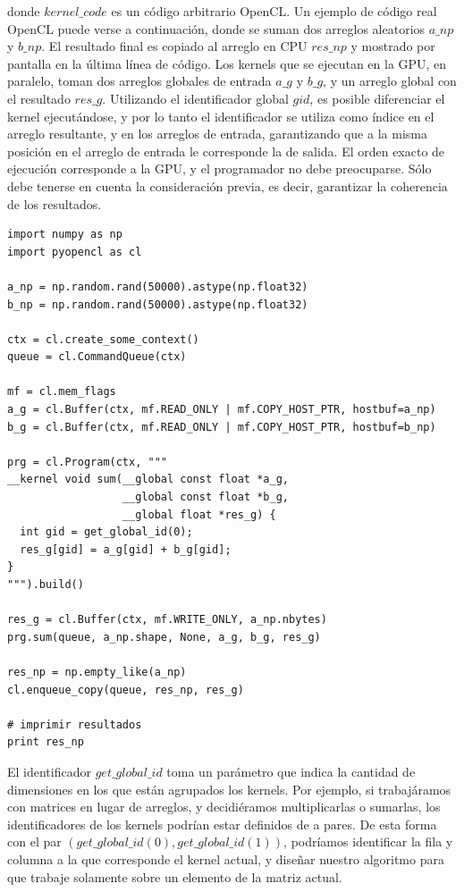donde $kernel\_code$ es un código arbitrario OpenCL.
Un ejemplo de código real OpenCL puede verse a continuación, donde se suman dos arreglos aleatorios $a\_{np}$ y $b\_{np}$. El resultado final es copiado al arreglo en CPU $res\_np$ y mostrado por pantalla en la última línea de código.
Los kernels que se ejecutan en la GPU, en paralelo, toman dos arreglos globales de entrada $a\_g$ y $b\_g$, y un arreglo global con el resultado $res\_g$.
Utilizando el identificador global $gid$, es posible diferenciar el kernel ejecutándose, y por lo tanto el identificador se utiliza como índice en el arreglo resultante, y en los arreglos de entrada, garantizando que a la misma posición en el arreglo de entrada le corresponde la de salida.
El orden exacto de ejecución corresponde a la GPU, y el programador no debe preocuparse.
Sólo debe tenerse en cuenta la consideración previa, es decir, garantizar la coherencia de los resultados.

\begin{verbatim}
import numpy as np
import pyopencl as cl

a_np = np.random.rand(50000).astype(np.float32)
b_np = np.random.rand(50000).astype(np.float32)

ctx = cl.create_some_context()
queue = cl.CommandQueue(ctx)

mf = cl.mem_flags
a_g = cl.Buffer(ctx, mf.READ_ONLY | mf.COPY_HOST_PTR, hostbuf=a_np)
b_g = cl.Buffer(ctx, mf.READ_ONLY | mf.COPY_HOST_PTR, hostbuf=b_np)

prg = cl.Program(ctx, """
__kernel void sum(__global const float *a_g,
                  __global const float *b_g,
                  __global float *res_g) {
  int gid = get_global_id(0);
  res_g[gid] = a_g[gid] + b_g[gid];
}
""").build()

res_g = cl.Buffer(ctx, mf.WRITE_ONLY, a_np.nbytes)
prg.sum(queue, a_np.shape, None, a_g, b_g, res_g)

res_np = np.empty_like(a_np)
cl.enqueue_copy(queue, res_np, res_g)

# imprimir resultados
print res_np
\end{verbatim}

El identificador $get\_global\_id$ toma un parámetro que indica la cantidad de dimensiones en los que están agrupados los kernels.
Por ejemplo, si trabajáramos con matrices en lugar de arreglos, y decidiéramos multiplicarlas o sumarlas, los identificadores de los kernels podrían estar definidos de a pares.
De esta forma con el par $(get\_global\_id(0), get\_global\_id(1))$, podríamos identificar la fila y columna a la que corresponde el kernel actual, y diseñar nuestro algoritmo para que trabaje solamente sobre un elemento de la matriz actual.

